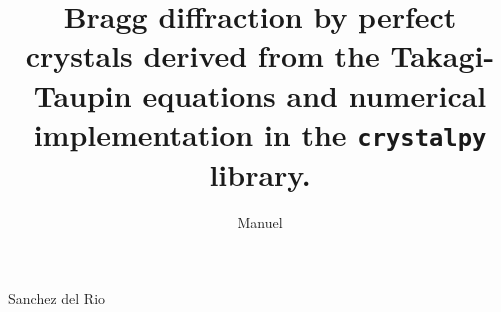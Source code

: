 \documentclass[preprint]{iucr}              %
\begin{document}



\title{Bragg diffraction by perfect crystals derived from the Takagi-Taupin equations and numerical implementation in the \texttt{crystalpy} library.}
%


\author[a]{Manuel}{Sanchez del Rio}











\end{document}
